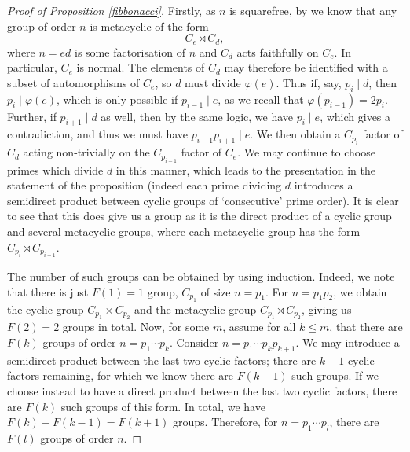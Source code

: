 \documentclass[a4paper,reqno]{amsart}
\theoremstyle{definition}
\begin{document}
\begin{proof}[Proof of Proposition \ref{fibbonacci}]
    Firstly, as $n$ is squarefree, by \cite{MM84} we know that any group of order $n$ is metacyclic of the form
    \[C_e \rtimes C_d,\]
    where $n=ed$ is some factorisation of $n$ and $C_d$ acts faithfully on $C_e$. In particular, $C_e$ is normal. The elements of $C_d$ may therefore be identified with a subset of automorphisms of $C_e$, so $d$ must divide $\varphi(e)$. Thus if, say, $p_i \mid d$, then $p_i \mid \varphi(e)$, which is only possible if $p_{i-1} \mid e$, as we recall that $\varphi(p_{i-1})=2p_i$. Further, if $p_{i+1} \mid d$ as well, then by the same logic, we have $p_i \mid e$, which gives a contradiction, and thus we must have $p_{i-1}p_{i+1} \mid e$. We then obtain a $C_{p_i}$ factor of $C_d$ acting non-trivially on the $C_{p_{i-1}}$ factor of $C_e$. We may continue to choose primes which divide $d$ in this manner, which leads to the presentation in the statement of the proposition (indeed each prime dividing $d$ introduces a semidirect product between cyclic groups of `consecutive' prime order). It is clear to see that this does give us a group as it is the direct product of a cyclic group and several metacyclic groups, where each metacyclic group has the form $C_{p_i}\rtimes C_{p_{i+1}}$.
 
    The number of such groups can be obtained by using induction. Indeed, we note that there is just $F(1)=1$ group, $C_{p_1}$ of size $n=p_1$. For $n=p_1p_2$, we obtain the cyclic group $C_{p_1}\times C_{p_2}$ and the metacyclic group $C_{p_1}\rtimes C_{p_2}$, giving us $F(2)=2$ groups in total. Now, for some $m$, assume for all $k\leq m$, that there are $F(k)$ groups of order $n=p_1\cdots p_k$. Consider $n=p_1\cdots p_kp_{k+1}$. We may introduce a semidirect product between the last two cyclic factors; there are $k-1$ cyclic factors remaining, for which we know there are $F(k-1)$ such groups. If we choose instead to have a direct product between the last two cyclic factors, there are $F(k)$ such groups of this form. In total, we have $F(k)+F(k-1)=F(k+1)$ groups. Therefore, for $n=p_1\cdots p_l$, there are $F(l)$ groups of order $n$.
\end{proof}
\end{document}
